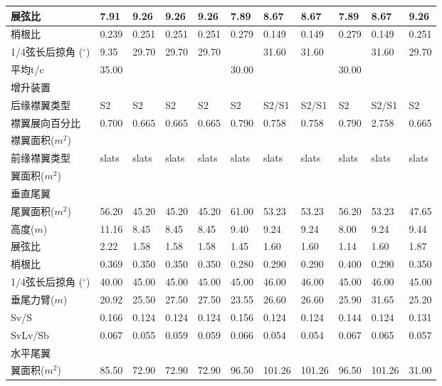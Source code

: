 \documentclass[12pt,a4paper]{report}
\begin{document}
\begin{landscape}
\begin{center}
\begin{longtable}{|p{1.5cm}|p{1.3cm}|p{1.1cm}|p{1.1cm}|p{1.1cm}|p{1.1cm}|p{1.1cm}|p{1.1cm}|p{1.1cm}|p{1.1cm}|p{1.1cm}|}
展弦比	&	7.91	&	9.26	&	9.26	&	9.26	&	7.89	&	8.67	&	8.67	&	7.89	&	8.67	&	9.26\\ \hline
梢根比	&	0.239	&	0.251	&	0.251	&	0.251	&	0.279	&	0.149	&	0.149	&	0.279	&	0.149	&	0.251\\ \hline
1/4弦长后掠角 ($^\circ$)	&	9.35	&	29.70	&	29.70	&	29.70	&		&	31.60	&	31.60	&		&	31.60	&	29.70\\ \hline
平均t/c 	&	35.00	&		&		&		&	30.00	&		&		&	30.00	&		&\\ \hline	
增升装置	&		&		&		&		&		&		&		&		&		&	\\ \hline
后缘襟翼类型	&	S2	&	S2	&	S2	&	S2	&	S2	&	S2/S1	&	S2/S1	&	S2	&	S2/S1	&	S2\\ \hline
襟翼展向百分比	&	0.700	&	0.665	&	0.665	&	0.665	&	0.790	&	0.758	&	0.758	&	0.790	&	2.758	&	0.665\\ \hline
襟翼面积($m^2$)	&		&		&		&		&		&		&		&		&		&	\\ \hline
前缘襟翼类型	&	slats	&	slats	&	slats	&	slats	&	slats	&	slats	&	slats	&	slats	&	slats	&	slats\\ \hline
翼面积($m^2$)	&		&		&		&		&		&		&		&		&		&	\\ \hline
垂直尾翼	&		&		&		&		&		&		&		&		&		&	\\ \hline
尾翼面积($m^2$)	&	56.20	&	45.20	&	45.20	&	45.20	&	61.00	&	53.23	&	53.23	&	56.20	&	53.23	&	47.65\\ \hline
高度($m$)	&	11.16	&	8.45	&	8.45	&	8.45	&	9.40	&	9.24	&	9.24	&	8.00	&	9.24	&	9.44\\ \hline
展弦比	&	2.22	&	1.58	&	1.58	&	1.58	&	1.45	&	1.60	&	1.60	&	1.14	&	1.60	&	1.87\\ \hline
梢根比	&	0.369	&	0.350	&	0.350	&	0.350	&	0.280	&	0.290	&	0.290	&	0.400	&	0.290	&	0.350\\ \hline
1/4弦长后掠角 ($^\circ$)	&	40.00	&	45.00	&	45.00	&	45.00	&	45.00	&	46.00	&	46.00	&	45.00	&	46.00	&	45.00\\ \hline
垂尾力臂($m$)	&	20.92	&	25.50	&	27.50	&	27.50	&	23.55	&	26.60	&	26.60	&	25.90	&	31.65	&	25.20\\ \hline
Sv/S	&	0.166	&	0.124	&	0.124	&	0.124	&	0.156	&	0.124	&	0.124	&	0.144	&	0.124	&	0.131\\ \hline
SvLv/Sb	&	0.067	&	0.055	&	0.059	&	0.059	&	0.066	&	0.054	&	0.054	&	0.067	&	0.065	&	0.057\\ \hline
水平尾翼	&		&		&		&		&		&		&		&		&		&	\\ \hline
翼面积($m^2$)	&	85.50	&	72.90	&	72.90	&	72.90	&	96.50	&	101.26	&	101.26	&	96.50	&	101.26	&	31.00\\ \hline

\end{longtable}
\end{center}
\end{landscape}
\end{document}
